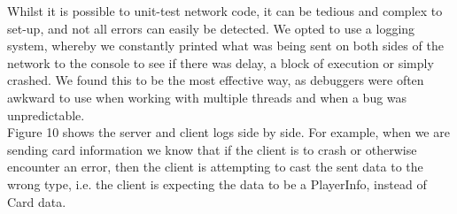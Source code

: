 \documentclass[11pt]{article}
\begin{document}
Whilst it is possible to unit-test network code, it can be tedious and complex to set-up, and not all errors can easily be detected. We opted to use a logging system, whereby we constantly printed what was being sent on both sides of the network to the console to see if there was delay, a block of execution or simply crashed. We found this to be the most effective way, as debuggers were often awkward to use when working with multiple threads and when a bug was unpredictable.\\

Figure 10 shows the server and client logs side by side. For example, when we are sending card information we know that if the client is to crash or otherwise encounter an error, then the client is attempting to cast the sent data to the wrong type, i.e. the client is expecting the data to be a PlayerInfo, instead of Card data.
\end{document}
